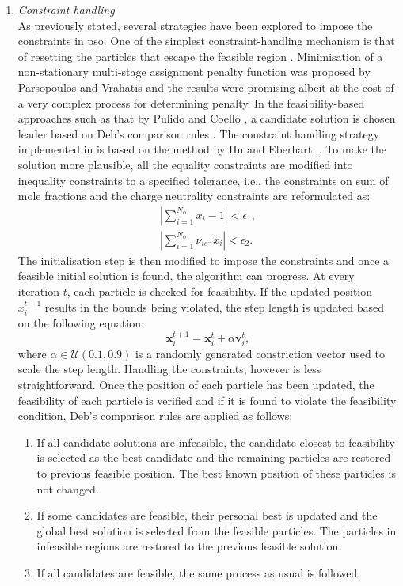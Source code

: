 	\begin{enumerate}
		\item \emph{Constraint handling}\\
			As previously stated, several strategies have been explored to impose the constraints in \gls{pso}. One of the simplest constraint-handling mechanism is that of resetting the particles that escape the feasible region \cite{Hu:2002aa,Guo:2004aa,Sun:2009aa}. Minimisation of a non-stationary multi-stage assignment penalty function was proposed by Parsopoulos and Vrahatis \cite{Parsopoulos:2005aa} and the results were promising albeit at the cost of a very complex process for determining penalty. In the feasibility-based approaches such as that by Pulido and Coello \cite{Pulido:2004aa}, a candidate solution is chosen leader based on Deb's comparison rules \cite{Deb:2000aa}. The constraint handling strategy implemented in {\GEM} is based on the method by Hu and Eberhart. \cite{Hu:2002aa}. To make the solution more plausible, all the equality constraints are modified into inequality constraints to a specified tolerance, i.e., the constraints on sum of mole fractions and the charge neutrality constraints are reformulated as:
			\begin{gather}
				\left | \sum_{i=1}^{N_\phi} x_i - 1 \right | <  \epsilon_1,\\
				\left | \sum_{i=1}^{N_\phi} \nu_{i{e^-}} x_i \right | < \epsilon_2.
			\end{gather} 
			The initialisation step is then modified to impose the constraints and once a feasible initial solution is found, the algorithm can progress. At every iteration $t$, each particle is checked for feasibility. If the updated position $x_i^{t+1}$ results in the bounds being violated, the step length is updated based on the following equation:
			\begin{equation}  \label{eq:PSO_pos_alpha}
				\mathbf{x}_i^{t+1} = \mathbf{x}_i^{t} + \alpha \mathbf{v}_i^{t},
			\end{equation}
			where $\alpha \in \mathcal{U} (0.1, 0.9)$ is a randomly generated constriction vector used to scale the step length. Handling the constraints, however is less straightforward. Once the position of each particle has been updated, the feasibility of each particle is verified and if it is found to violate the feasibility condition, Deb's comparison rules \cite{Deb:2000aa} are applied as follows:
			\begin{enumerate}
				\item	If all candidate solutions are infeasible, the candidate closest to feasibility is selected as the best candidate and the remaining particles are restored to previous feasible position. The best known position of these particles is not changed.
				\item If some candidates are feasible, their personal best is updated and the global best solution is selected from the feasible particles. The particles in infeasible regions are restored to the previous feasible solution.
				\item If all candidates are feasible, the same process as usual is followed.
			\end{enumerate}
			

\end{enumerate}
